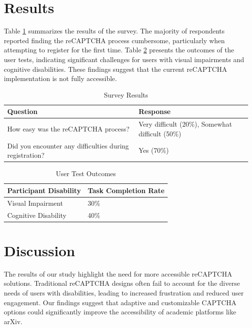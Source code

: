 \documentclass{article}
\begin{document}
\section{Results}
Table \ref{tab:survey_results} summarizes the results of the survey. The majority of respondents reported finding the reCAPTCHA process cumbersome, particularly when attempting to register for the first time. Table \ref{tab:user_tests} presents the outcomes of the user tests, indicating significant challenges for users with visual impairments and cognitive disabilities. These findings suggest that the current reCAPTCHA implementation is not fully accessible.

\begin{table}[ht]
\centering
\caption{Survey Results}
\label{tab:survey_results}
\begin{tabularx}{\textwidth}{|X|X|}
\hline
\textbf{Question} & \textbf{Response} \\
\hline
How easy was the reCAPTCHA process? & Very difficult (20\%), Somewhat difficult (50\%) \\
\hline
Did you encounter any difficulties during registration? & Yes (70\%) \\
\hline
\end{tabularx}
\end{table}

\begin{table}[ht]
\centering
\caption{User Test Outcomes}
\label{tab:user_tests}
\begin{tabularx}{\textwidth}{|X|X|}
\hline
\textbf{Participant Disability} & \textbf{Task Completion Rate} \\
\hline
Visual Impairment & 30\% \\
\hline
Cognitive Disability & 40\% \\
\hline
\end{tabularx}
\end{table}

\section{Discussion}
The results of our study highlight the need for more accessible reCAPTCHA solutions. Traditional reCAPTCHA designs often fail to account for the diverse needs of users with disabilities, leading to increased frustration and reduced user engagement. Our findings suggest that adaptive and customizable CAPTCHA options could significantly improve the accessibility of academic platforms like arXiv.
\end{document}
